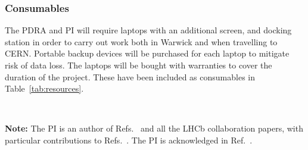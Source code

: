 \documentclass[11pt,a4paper]{article}
\begin{document}
\subsubsection{Consumables}
The PDRA and PI will require laptops with an additional screen, and docking station in order to carry out work both in Warwick and when travelling to CERN. Portable backup devices will be purchased for each laptop to mitigate risk of data loss. The laptops will be bought with warranties to cover the duration of the project. These have been included as consumables in Table~\ref{tab:resources}.

\clearpage
\begingroup

    \linespread{0.9}\selectfont


\endgroup

~ 

{\bf Note:} The PI is an author of Refs.~\cite{LHCb-PUB-2014-027,Bourgeois:2018nvk} and all the LHCb collaboration papers, with particular contributions to  Refs.~\cite{Aaij:2014jba,CERN-LHCC-2014-016,Aaij:2013mga,Aaij:2014ywt,LHCb-PUB-2014-040,Aaij:2016kjh,Aaij:2017lff}.
The PI is acknowledged in Ref.~\cite{Jung:2014jfa}.
\end{document}
